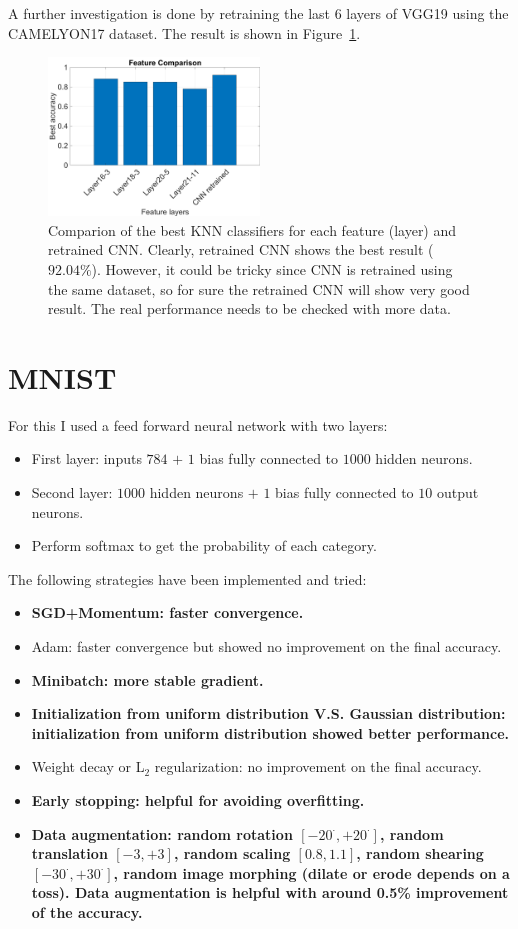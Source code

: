 \documentclass[a4paper]{article}
\begin{document}
A further investigation is done by retraining the last $6$ layers of VGG19 using the CAMELYON17 dataset. The result is shown in Figure~\ref{figknn3}.
	\begin{figure}[ht]
	\centering
	\includegraphics[width=0.5\textwidth]{figures/ex5_3.png}
	\caption{Comparion of the best KNN classifiers for each feature (layer) and retrained CNN. Clearly, retrained CNN shows the best result ($92.04\%$). However, it could be tricky since CNN is retrained using the same dataset, so for sure the retrained CNN will show very good result. The real performance needs to be checked with more data.}
	\label{figknn3}
\end{figure}

\section{MNIST}
For this I used a feed forward neural network with two layers:
\begin{itemize}
	\item First layer: inputs $784$ $+$ $1$ bias fully connected to $1000$ hidden neurons.
	\item Second layer: $1000$ hidden neurons $+$ $1$ bias fully connected to $10$ output neurons.
	\item Perform softmax to get the probability of each category.
\end{itemize}

The following strategies have been implemented and tried:
\begin{itemize}
	\item \textbf{SGD+Momentum:  faster convergence.}
	\item Adam:  faster convergence but showed no improvement on the final accuracy.
	\item \textbf{Minibatch: more stable gradient.}
	\item \textbf{Initialization from uniform distribution V.S. Gaussian distribution: initialization from uniform distribution showed better performance.}
	\item Weight decay or L$_2$ regularization: no improvement on the final accuracy.
	\item \textbf{Early stopping: helpful for avoiding overfitting.}
	\item \textbf{Data augmentation: random rotation $[-20^{\cdot},+20^{\cdot}]$, random translation $[-3,+3]$, random scaling $[0.8,1.1]$, random shearing $[-30^{\cdot},+30^{\cdot}]$, random image morphing (dilate or erode depends on a toss). Data augmentation is helpful with around 0.5\% improvement of the accuracy.}
\end{itemize}
\end{document}
